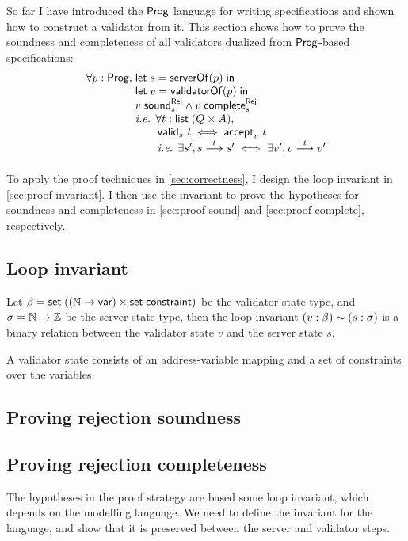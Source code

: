 So far I have introduced the $\mathsf{Prog}$ language for writing specifications and
shown how to construct a validator from it.  This section shows how to prove the
soundness and completeness of all validators dualized from $\mathsf{Prog}$-based
specifications:
\[\begin{array}{r@{\;}l}
\forall p:\Prog,&\letin{s}{\serverOf(p)}\\
&\letin{v}{\validatorOf(p)}\\
&\rejSound v s\wedge\rejComplete v s\\
&\text{\it i.e. }\forall t:\List(Q\times A),\\
&\qquad\valid s t\iff\accepts v t\\
&\qquad\text{\it i.e. }\exists s',\behaves s t s'\iff\exists v',\behaves v t v'
\end{array}\]

To apply the proof techniques in \autoref{sec:correctness}, I design the loop
invariant in \autoref{sec:proof-invariant}.  I then use the invariant to prove
the hypotheses for soundness and completeness in \autoref{sec:proof-sound}
and \autoref{sec:proof-complete}, respectively.

\subsection{Loop invariant}
\label{sec:proof-invariant}
Let $\beta=\mathsf{set}\;((\mathbb N\to\mathsf{var})\times\mathsf{set}\;\mathsf{constraint})$ be the validator state
type, and $\sigma=\mathbb N\to\mathbb Z$ be the server state type, then the loop invariant
$(v:\beta)\sim (s:\sigma)$ is a binary relation between the validator
state $v$ and the server state $s$.

A validator state consists of an address-variable mapping and a set of
constraints over the variables.

\subsection{Proving rejection soundness}
\label{sec:proof-sound}

\subsection{Proving rejection completeness}
\label{sec:proof-complete}


The hypotheses in the proof strategy are based some loop invariant, which
depends on the modelling language.  We need to define the invariant for the
language, and show that it is preserved between the server and validator steps.

